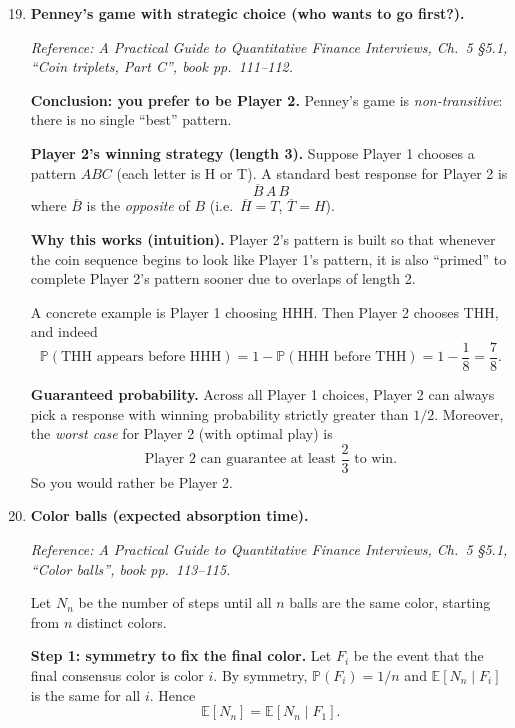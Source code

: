 \documentclass[11pt]{article}
\begin{document}
\begin{enumerate}[leftmargin=*, itemsep=1.0em]
\setcounter{enumi}{18}

\item \textbf{Penney's game with strategic choice (who wants to go first?).}

\textit{Reference: A Practical Guide to Quantitative Finance Interviews, Ch.\ 5 \S5.1, ``Coin triplets, Part C'', book pp.\ 111--112.}

\medskip
\textbf{Conclusion: you prefer to be Player 2.}
Penney's game is \emph{non-transitive}: there is no single ``best'' pattern.

\medskip
\textbf{Player 2's winning strategy (length 3).}
Suppose Player 1 chooses a pattern $ABC$ (each letter is H or T).
A standard best response for Player 2 is
\[
\boxed{\ \overline{B}\,A\,B\ }
\]
where $\overline{B}$ is the \emph{opposite} of $B$ (i.e.\ $\overline{H}=T$, $\overline{T}=H$).

\medskip
\textbf{Why this works (intuition).}
Player 2's pattern is built so that whenever the coin sequence begins to look like Player 1's pattern, it is also ``primed'' to complete Player 2's pattern sooner due to overlaps of length 2.

A concrete example is Player 1 choosing HHH. Then Player 2 chooses THH, and indeed
\[
\mathbb{P}(\text{THH appears before HHH})=1-\mathbb{P}(\text{HHH before THH})=1-\frac18=\frac78.
\]

\medskip
\textbf{Guaranteed probability.}
Across all Player 1 choices, Player 2 can always pick a response with winning probability strictly greater than $1/2$.
Moreover, the \emph{worst case} for Player 2 (with optimal play) is
\[
\boxed{\ \text{Player 2 can guarantee at least } \frac{2}{3} \text{ to win.}\ }
\]
So you would rather be Player 2.

\item \textbf{Color balls (expected absorption time).}

\textit{Reference: A Practical Guide to Quantitative Finance Interviews, Ch.\ 5 \S5.1, ``Color balls'', book pp.\ 113--115.}

\medskip
Let $N_n$ be the number of steps until all $n$ balls are the same color, starting from $n$ distinct colors.

\textbf{Step 1: symmetry to fix the final color.}
Let $F_i$ be the event that the final consensus color is color $i$.
By symmetry, $\mathbb{P}(F_i)=1/n$ and $\mathbb{E}[N_n\mid F_i]$ is the same for all $i$.
Hence
\[
\mathbb{E}[N_n]=\mathbb{E}[N_n\mid F_1].
\]


\end{enumerate}
\end{document}
